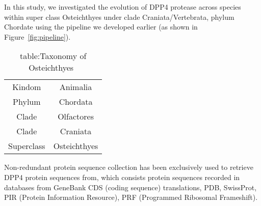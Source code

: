 In this study, we investigated the evolution of DPP4 protease across species within super class Osteichthyes under clade Craniata/Vertebrata, phylum Chordate using the pipeline we developed earlier (as shown in Figure~\ref{fig:pipeline}). 

\begin{table} 
\caption{table:Taxonomy of Osteichthyes~\cite{18563158}} 
\centering
    \begin{tabular}{| c | c |}
    \hline
        Kindom & Animalia \\ 
        Phylum & Chordata \\ 
        Clade & Olfactores \\ 
        Clade & Craniata \\ 
        Superclass &  Osteichthyes\\ 
    \hline
    \end{tabular} 
\end{table}

Non-redundant protein sequence collection has been exclusively used to retrieve DPP4 protein sequences from, which consists protein sequences recorded in databases from GeneBank CDS (coding sequence) translations, PDB, SwissProt, PIR (Protein Information Resource), PRF (Programmed Ribosomal Frameshift). 